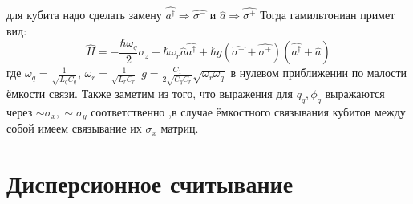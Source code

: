 \documentclass[12pt, a4paper, openany]{book}
\begin{document}
для кубита надо сделать замену  $\hat{a^{\dagger}}\Rightarrow \hat{\sigma^-} $ и
 $\hat{a}\Rightarrow \hat{\sigma^+}$ 
Тогда гамильтониан примет вид:
\begin{equation}
\hat{H}=-\frac{\hbar\omega_q }{2}\sigma_z+\hbar\omega_r\hat{a}\hat{a^{\dagger}}+\hbar g 
(\hat{\sigma^-}+\hat{\sigma^+})(\hat{a^{\dagger}}+\hat{a})
\label{eq:Jc}
\end{equation}
где $\omega_q=\frac{1}{\sqrt{L_qC_q}}$,
$\omega_r=\frac{1}{\sqrt{L_rC_r}}$
$g=\frac{C_1}{2\sqrt{C_qC_r}}\sqrt{\omega_r\omega_q}$ в нулевом приближении по малости ёмкости связи.
Также заметим из того, что выражения для $q_q , \phi_q$ выражаются через $\sim \sigma_x ,\sim \sigma_y$ соответственно
,в случае ёмкостного связывания кубитов между собой имеем связывание их $\sigma_x$  матриц.

\section{Дисперсионное считывание}
\end{document}
